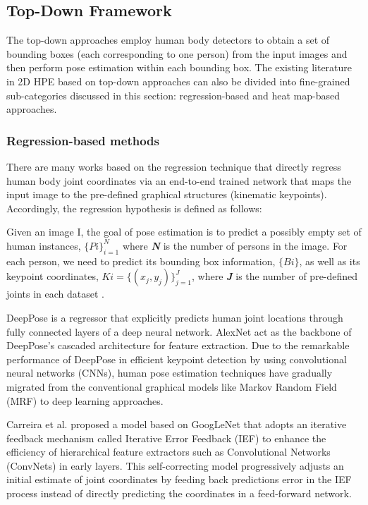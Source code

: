 \subsection{Top-Down Framework}

The top-down approaches employ human body detectors \cite{micilotta_real-time_2006, ren_faster_2015} to obtain a set of bounding boxes (each corresponding to one person) from the input images and then perform pose estimation within each bounding box. The existing literature in 2D HPE based on top-down approaches can also be divided into fine-grained sub-categories discussed in this section: regression-based and heat map-based approaches. 

\subsubsection{Regression-based methods}

There are many works based on the regression technique \cite{carreira_human_2016, fieraru_learning_2018, li_heterogeneous_2015, sun_compositional_nodate, toshev_deeppose_2014, wang_deep_2021} that directly regress human body joint coordinates via an end-to-end trained network that maps the input image to the pre-defined graphical structures (kinematic keypoints). Accordingly, the regression hypothesis is defined as follows:

Given an image I, the goal of pose estimation is to predict a possibly empty set of human instances, $\{Pi\}_{i=1}^N$ where \textbf{\textit{N}} is the number of persons in the image. For each person, we need to predict its bounding box information, $\{Bi\}$, as well as its keypoint coordinates, $Ki=\{(x_j, y_j)\}_{j=1}^J$, where \textbf{\textit{J}} is the number of pre-defined joints in each dataset \cite{li_pose_2021}.

DeepPose \cite{toshev_deeppose_2014} is a regressor that explicitly predicts human joint locations through fully connected layers of a deep neural network. AlexNet \cite{krizhevsky_imagenet_2012} act as the backbone of DeepPose's cascaded architecture for feature extraction. Due to the remarkable performance of DeepPose in efficient keypoint detection by using convolutional neural networks (CNNs), human pose estimation techniques have gradually migrated from the conventional graphical models \cite{tompson_joint_nodate, feng_ning_toward_2005} like Markov Random Field (MRF) \cite{li_markov_1994} to deep learning approaches. 

Carreira et al. \cite{carreira_human_2016} proposed a model based on GoogLeNet \cite{szegedy_going_2015} that adopts an iterative feedback mechanism called Iterative Error Feedback (IEF) to enhance the efficiency of hierarchical feature extractors such as Convolutional Networks (ConvNets) in early layers. This self-correcting model progressively adjusts an initial estimate of joint coordinates by feeding back predictions error in the IEF process instead of directly predicting the coordinates in a feed-forward network.

